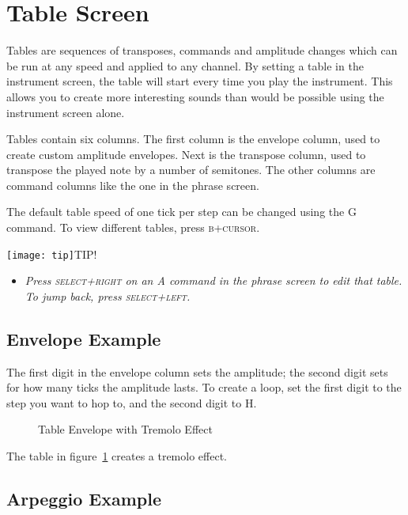 \section{Table Screen}

Tables are sequences of transposes, commands and amplitude changes which can be run at any speed and applied to any channel. By setting a table in the instrument screen, the table will start every time you play the instrument. This allows you to create more interesting sounds than would be possible using the instrument screen alone.

Tables contain six columns. The first column is the envelope column, used to create custom amplitude envelopes. Next is the transpose column, used to transpose the played note by a number of semitones. The other columns are command columns like the one in the phrase screen.

The default table speed of one tick per step can be changed using the G command. To view different tables, press \textsc{b+cursor}.

\texttt{[image: tip]}TIP!
\begin{itemize}
	\item \textit{Press \textsc{select+right} on an A command in the phrase screen to edit that table. To jump back, press \textsc{select+left}.}
\end{itemize}

\subsection{Envelope Example}

The first digit in the envelope column sets the amplitude; the second digit sets for how many ticks the amplitude lasts.
To create a loop, set the first digit to the step you want to hop to, and the second digit to \textsc{H}.

\begin{figure}[htpb]
	\begin{center}
	\end{center}
	\caption{Table Envelope with Tremolo Effect}
	\label{fig:table-amp}
\end{figure}

The table in figure~\ref{fig:table-amp} creates a tremolo effect.

\subsection{Arpeggio Example}

